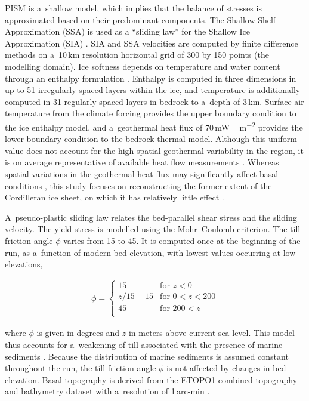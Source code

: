 PISM is a~shallow model, which implies that the balance of stresses is
approximated based on their predominant components.
The Shallow Shelf Approximation (SSA) is used as a ``sliding law'' for the
Shallow Ice Approximation (SIA) \citep{bueler-brown-2009,winkelmann-etal-2011}.
SIA and SSA velocities are computed by finite difference methods on a~10\,km
resolution horizontal grid of 300 by 150 points (the modelling domain). Ice
softness depends on temperature and water content through an enthalpy
formulation \citep{aschwanden-blatter-2009,aschwanden-etal-2012}. Enthalpy is
computed in three dimensions in up to 51 irregularly spaced layers within the
ice, and temperature is additionally computed in 31 regularly spaced layers in
bedrock to a~depth of 3\,km. Surface air temperature from the climate forcing
provides the upper boundary condition to the ice enthalpy model, and
a~geothermal heat flux of 70\,\unit{mW\,m^{-2}} provides the lower boundary
condition to the bedrock thermal model. Although this uniform value does not
account for the high spatial geothermal variability in the region, it is on
average representative of available heat flow measurements
\citep{artemieva-mooney-2001,blackwell-richards-2004}. Whereas spatial
variations in the geothermal heat flux may significantly affect basal
conditions \citep{pattyn-2010}, this study focuses on reconstructing the former
extent of the Cordilleran ice sheet, on which it has relatively little effect
\citep{rogozhina-etal-2012}.


A~pseudo-plastic sliding law \citep{aschwanden-etal-2013} relates the
bed-parallel shear stress and the sliding velocity. The yield stress is
modelled using the Mohr--Coulomb criterion. The till friction angle $\phi$
varies from 15 to 45{\degree}. It is computed once at the beginning of the run,
as a~function of modern bed elevation, with lowest values occurring at low
elevations,

\begin{align}
  \phi =
  \begin{cases}
    15      & \text{for }       z<  0 \\
    z/15+15 & \text{for }    0 <z<200 \\
    45      & \text{for }  200 <z     \\
  \end{cases}
\end{align}

where $\phi$ is given in degrees and $z$ in meters above current sea level.
This model thus accounts for a~weakening of till associated with the presence
of marine sediments \citep{martin-etal-2011,aschwanden-etal-2013}. Because the
distribution of marine sediments is assumed constant throughout the run, the
till friction angle $\phi$ is not affected by changes in bed elevation. Basal
topography is derived from the ETOPO1 combined topography
and bathymetry dataset with a~resolution of 1\,arc-min \citep{data:etopo1}.

